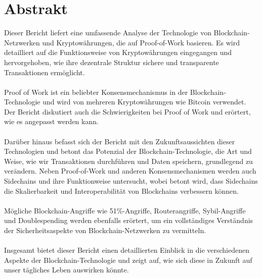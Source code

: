 \chapter{Abstrakt}
	Dieser Bericht liefert eine umfassende Analyse der Technologie von Blockchain-Netzwerken und Kryptowährungen, die auf Proof-of-Work basieren. Es wird detailliert auf die Funktionsweise von Kryptowährungen eingegangen und hervorgehoben, wie ihre dezentrale Struktur sichere und transparente Transaktionen ermöglicht.\\ \\
	Proof of Work ist ein beliebter Konsensmechanismus in der Blockchain-Technologie und wird von mehreren Kryptowährungen wie Bitcoin verwendet. Der Bericht diskutiert auch die Schwierigkeiten bei Proof of Work und erörtert, wie es angepasst werden kann.\\ \\
	Darüber hinaus befasst sich der Bericht mit den Zukunftsaussichten dieser Technologien und betont das Potenzial der Blockchain-Technologie, die Art und Weise, wie wir Transaktionen durchführen und Daten speichern, grundlegend zu verändern. Neben Proof-of-Work und anderen Konsensmechanismen werden auch Sidechains und ihre Funktionweise untersucht, wobei betont wird, dass Sidechains die Skalierbarkeit und Interoperabilität von Blockchains verbessern können.\\ \\
	Mögliche Blockchain-Angriffe wie 51\%-Angriffe, Routerangriffe, Sybil-Angriffe und Doublespending werden ebenfalls erörtert, um ein vollständiges Verständnis der Sicherheitsaspekte von Blockchain-Netzwerken zu vermitteln.\\ \\
	Insgesamt bietet dieser Bericht einen detaillierten Einblick in die verschiedenen Aspekte der Blockchain-Technologie und zeigt auf, wie sich diese in Zukunft auf unser tägliches Leben auswirken könnte.


\tableofcontents
\listoffigures

\mainmatter                     %

